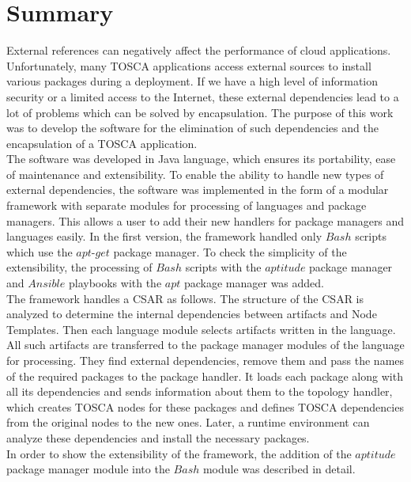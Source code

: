 
\chapter{Summary}\label{chap:zusfas}
External references can negatively affect the performance of cloud applications.
Unfortunately, many TOSCA applications access external sources to install various packages during a deployment.
If we have a high level of information security or a limited access to the Internet, these external dependencies lead to a lot of problems which can be solved by encapsulation.
The purpose of this work was to develop the software for the elimination of such dependencies and the encapsulation of a TOSCA application.\\
The software was developed in Java language, which ensures its portability, ease of maintenance and extensibility.
To enable the ability to handle new types of external dependencies, the software was implemented in the form of a modular framework with separate modules for processing of languages and package managers.
This allows a user to add their new handlers for package managers and languages easily.
In the first version, the framework handled only $Bash$ scripts  which use the $apt$-$get$ package manager.
To check the simplicity of the extensibility, the processing of $Bash$ scripts with the $aptitude$ package manager and  $Ansible$ playbooks with the $apt$ package manager was added.\\
The framework handles a CSAR as follows.
The structure of the CSAR is analyzed to determine the internal dependencies between artifacts and Node Templates.
Then each language module selects artifacts written in the language.
All such artifacts are transferred to the package manager modules of the language for processing.
They find external dependencies, remove them and pass the names of the required packages to the package handler.
It loads each package along with all its dependencies and sends information about them to the topology handler, which creates TOSCA nodes for these packages and defines TOSCA dependencies from the original nodes to the new ones.
Later, a runtime environment can analyze these dependencies and install the necessary packages.\\
In order to show the extensibility of the framework, the addition of the $aptitude$ package manager module into the $Bash$ module was described in detail.
